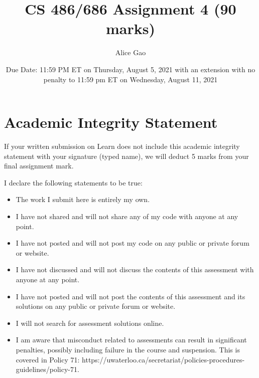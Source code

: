 \documentclass[12pt]{article}
\title{CS 486/686 Assignment 4 (90 marks)}
\author{Alice Gao}
\date{Due Date: 11:59 PM ET on Thursday, August 5, 2021
with an extension with no penalty to 11:59 pm ET on Wednesday, August 11, 2021}
\begin{document}
\maketitle



\newpage
\section*{Academic Integrity Statement}

{\color{red} If your written submission on Learn does not include this academic integrity statement with your signature (typed name), we will deduct 5 marks from your final assignment mark.}


I declare the following statements to be true:

\begin{itemize}
\item 
The work I submit here is entirely my own.

\item 	
I have not shared and will not share any of my code with anyone at any point. 

\item 
I have not posted and will not post my code on any public or private forum or website.

\item 	
I have not discussed and will not discuss the contents of this assessment with anyone at any point.

\item 
I have not posted and will not post the contents of this assessment and its solutions on any public or private forum or website. 

\item 
I will not search for assessment solutions online.

\item 
I am aware that misconduct related to assessments can result in significant penalties, possibly including failure in the course and suspension. This is covered in Policy 71: https://uwaterloo.ca/secretariat/policies-procedures-guidelines/policy-71.
\end{itemize}
\end{document}
